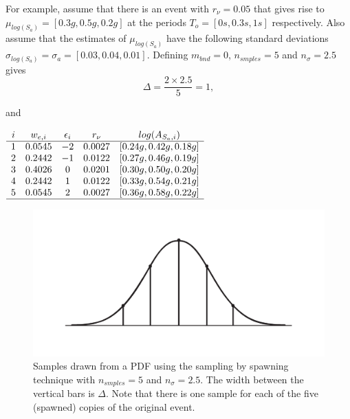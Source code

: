 For example, assume that there is an event with $r_\nu=0.05$ that
gives rise to \mbox{$\mu_{log(S_a)}=[0.3g, 0.5g, 0.2g]$} at the
periods \mbox{$T_o = [0s,0.3s,1s]$} respectively. Also assume that
the estimates of $\mu_{log(S_a)}$ have the following standard
deviations \mbox{$\sigma_{log(S_a)}=\sigma_a = [0.03,0.04,0.01]$}.
Defining $m_{bnd}=0$, $n_{smples}=5$ and $n_\sigma=2.5$ gives
\begin{equation}
\Delta = \frac{2 \times 2.5}{5} = 1,
\end{equation}

and

\begin{center} $ \begin{array}{ccccc}
i & w_{e,i} & \epsilon_i & r_\nu & log(A_{S_a,i}) \\
\hline
1 & 0.0545 & -2 & 0.0027 & [0.24g, 0.42g, 0.18g] \\
2 & 0.2442 & -1 & 0.0122 & [0.27g, 0.46g, 0.19g] \\
3 & 0.4026 & 0  & 0.0201 & [0.30g, 0.50g, 0.20g] \\
4 & 0.2442 & 1  & 0.0122 & [0.33g, 0.54g, 0.21g] \\
5 & 0.0545 & 2  & 0.0027 & [0.36g, 0.58g, 0.22g] \\
\hline
\end{array}$
\end{center}

\begin{figure}
\includegraphics[width=1\textwidth]{diags/fig-hattn-spawning}
\caption{Samples drawn from a PDF using the sampling by spawning
technique with $n_{smples}=5$ and $n_\sigma=2.5$. The width between
the vertical bars is $\Delta$. Note that there is one sample for
each of the five (spawned) copies of the original event.}
\label{fig:hattn-spawnsamp}
\end{figure}

